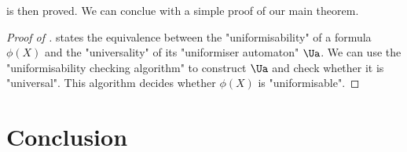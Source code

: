 \documentclass[a4paper,UKenglish,cleveref, autoref, thm-restate]{lipics-v2021}
\begin{document}
 is then proved. We can conclue with a simple proof of our main theorem.

\begin{proof}[Proof of ]
	 states the equivalence between the "uniformisability" of a formula $\phi(X)$ and the "universality" of its "uniformiser automaton" $\Ua$.
	We can use the "uniformisability checking algorithm" to construct $\Ua$ and check whether it is "universal". This algorithm decides whether $\phi(X)$ is "uniformisable".
\end{proof}

\section{Conclusion}








\end{document}
